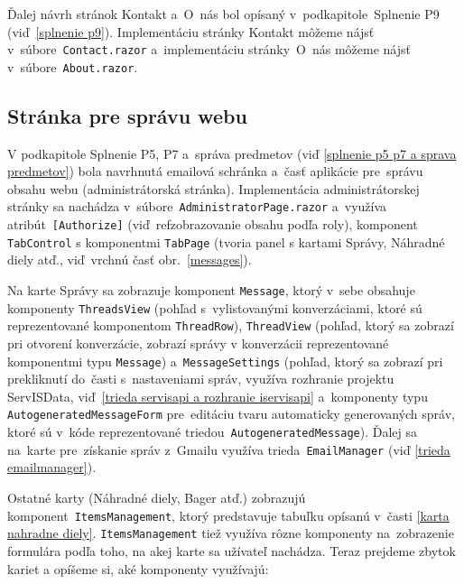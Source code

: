 Ďalej návrh stránok Kontakt a~O~nás bol opísaný v~podkapitole~Splnenie P9 (viď~\ref{splnenie p9}). Implementáciu stránky Kontakt môžeme nájsť v~súbore~\verb|Contact.razor| a~implementáciu stránky~O~nás môžeme nájsť v~súbore~\verb|About.razor|.

\subsection{Stránka pre správu webu}

V podkapitole Splnenie P5, P7 a~správa predmetov (viď \ref{splnenie p5 p7 a sprava predmetov}) bola navrhnutá emailová schránka a~časť aplikácie pre~správu obsahu webu (administrátorská stránka). Implementácia administrátorskej stránky sa nachádza v~súbore~\verb|AdministratorPage.razor| a~využíva atribút~\verb|[Authorize]| (viď~ref{zobrazovanie obsahu podľa roly}), komponent \verb|TabControl| s komponentmi \verb|TabPage| (tvoria panel s kartami Správy, Náhradné diely atď., viď~vrchnú časť obr.~\ref{messages}). 

Na karte Správy sa zobrazuje komponent \verb|Message|, ktorý v~sebe obsahuje komponenty \verb|ThreadsView| (pohľad s~vylistovanými konverzáciami, ktoré sú reprezentované komponentom \verb|ThreadRow|), \verb|ThreadView| (pohľad, ktorý sa zobrazí pri otvorení konverzácie, zobrazí správy v konverzácii reprezentované komponentmi typu \verb|Message|) a~\verb|MessageSettings| (pohľad, ktorý sa zobrazí pri prekliknutí do~časti s~nastaveniami správ, využíva rozhranie projektu ServISData, viď~\ref{trieda servisapi a rozhranie iservisapi} a~komponenty typu \verb|AutogeneratedMessageForm| pre~editáciu tvaru automaticky generovaných správ, ktoré sú v~kóde reprezentované triedou~\verb|AutogeneratedMessage|). Ďalej sa na~karte pre~získanie správ z~Gmailu využíva trieda~\verb|EmailManager| (viď \ref{trieda emailmanager}).

Ostatné karty (Náhradné diely, Bager atď.) zobrazujú komponent~\verb|ItemsManagement|, ktorý predstavuje tabuľku opísanú v~časti \ref{karta nahradne diely}. \verb|ItemsManagement| tiež využíva rôzne komponenty na~zobrazenie formulára podľa toho, na akej karte sa užívateľ nachádza. Teraz prejdeme zbytok kariet a opíšeme si, aké komponenty využívajú:

